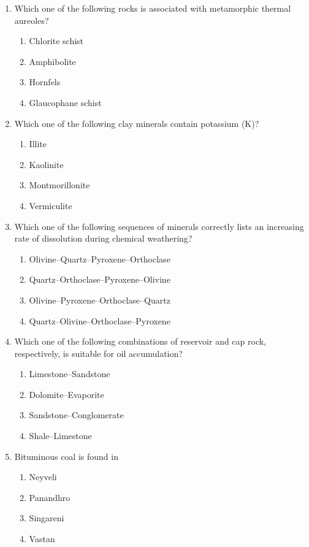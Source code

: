 \documentclass[journal,12pt,onecolumn]{IEEEtran}
\theoremstyle{remark}
\begin{document}
\begin{enumerate}[resume]
\item Which one of the following rocks is associated with metamorphic thermal aureoles?  
\begin{multicols}{4}
\begin{enumerate}
\item Chlorite schist
\item Amphibolite
\item Hornfels
\item Glaucophane schist
\end{enumerate}
\end{multicols}

\item Which one of the following clay minerals contain potassium (K)?  
\begin{enumerate}
\item Illite
\item Kaolinite
\item Montmorillonite
\item Vermiculite
\end{enumerate}

\item Which one of the following sequences of minerals correctly lists an increasing rate of dissolution during chemical weathering?  
\begin{enumerate}
\item Olivine--Quartz--Pyroxene--Orthoclase
\item Quartz--Orthoclase--Pyroxene--Olivine
\item Olivine--Pyroxene--Orthoclase--Quartz
\item Quartz--Olivine--Orthoclase--Pyroxene
\end{enumerate}

\item Which one of the following combinations of reservoir and cap rock, respectively, is suitable for oil accumulation?  
\begin{enumerate}
\item Limestone--Sandstone
\item Dolomite--Evaporite
\item Sandstone--Conglomerate
\item Shale--Limestone
\end{enumerate}

\item Bituminous coal is found in  
\begin{multicols}{4}
\begin{enumerate}
\item Neyveli
\item Panandhro
\item Singareni
\item Vastan
\end{enumerate}
\end{multicols}


\end{enumerate}
\end{document}
